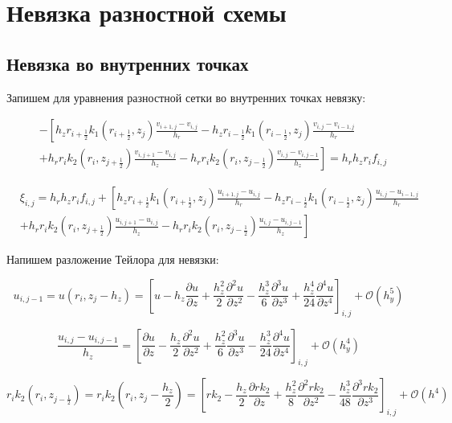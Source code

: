 \section{Невязка разностной схемы}

\subsection{Невязка во внутренних точках}

Запишем для уравнения разностной сетки во внутренних точках невязку:

\begin{align*}
  &- \left [ 
  h_z r_{i+\frac{1}{2}} k_1(r_{i+\frac{1}{2}}, z_j) \frac{v_{i+1, j} - v_{i, j}}{h_{r}}
  - h_z r_{i-\frac{1}{2}} k_1(r_{i-\frac{1}{2}}, z_j) \frac{v_{i, j} - v_{i - 1, j}}{h_{r}}
  \right . \\
  &\left .
  + h_r r_{i} k_2(r_i, z_{j+\frac{1}{2}}) \frac{v_{i, j + 1} - v_{i, j}}{h_{z}}
  - h_r r_{i} k_2(r_i, z_{j-\frac{1}{2}}) \frac{v_{i, j} - v_{i, j - 1}}{h_z}
  \right ]  = h_r h_z r_i f_{i, j}
\end{align*}

\begin{align*}
  &\xi_{i, j} = h_r h_z r_i f_{i, j} + 
  \left [ 
  h_z r_{i+\frac{1}{2}} k_1(r_{i+\frac{1}{2}}, z_j) \frac{u_{i+1, j} - u_{i, j}}{h_{r}}
  - h_z r_{i-\frac{1}{2}} k_1(r_{i-\frac{1}{2}}, z_j) \frac{u_{i, j} - u_{i - 1, j}}{h_{r}}
  \right . \\
  &\left .
  + h_r r_{i} k_2(r_i, z_{j+\frac{1}{2}}) \frac{u_{i, j + 1} - u_{i, j}}{h_{z}}
  - h_r r_{i} k_2(r_i, z_{j-\frac{1}{2}}) \frac{u_{i, j} - u_{i, j - 1}}{h_z}
  \right ]
\end{align*}

Напишем разложение Тейлора для невязки:

\[
u_{i, j - 1} = u(r_i, z_j - h_z) = \left[
  u - h_z \frac{\partial u}{\partial z} + \frac{h_z^2}{2}\frac{\partial^2 u}{\partial z^2}
  - \frac{h_z^3}{6}\frac{\partial^3 u}{\partial z^3} + \frac{h_z^4}{24}\frac{\partial^4 u}{\partial z^4}
\right]_{i, j} + \mathcal{O}(h^5_y)
\]

\[
  \frac{u_{i, j} - u_{i, j - 1}}{h_z} = \left[
    \frac{\partial u}{\partial z} - \frac{h_z}{2}\frac{\partial^2 u}{\partial z^2}
    + \frac{h_z^2}{6}\frac{\partial^3 u}{\partial z^3} - \frac{h_z^3}{24}\frac{\partial^4 u}{\partial z^4}
  \right]_{i,j} + \mathcal{O}(h^4_y)
\]

\[
  r_{i} k_2(r_i, z_{j-\frac{1}{2}}) = r_i k_2(r_i, z_j - \frac{h_z}{2}) =
  \left[
   r k_2 - \frac{h_z}{2} \frac{\partial r k_2}{\partial z}
   + \frac{h_z^2}{8} \frac{\partial^2 r k_2}{\partial z^2}
   - \frac{h_z^3}{48} \frac{\partial^3 r k_2}{\partial z^3}
  \right]_{i, j} + \mathcal{O}(h^4)
\]

